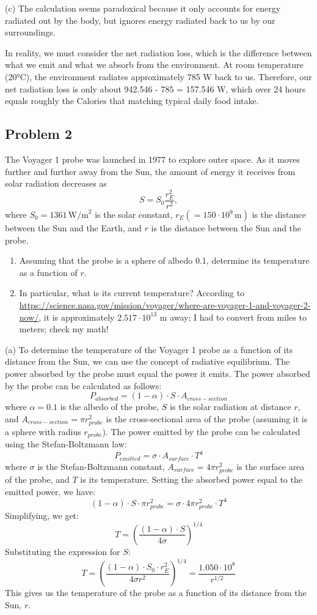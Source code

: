 \documentclass[letterpaper, 11pt]{article}
\newcommand{\1}{\mathds{1}}	%
\theoremstyle{definition}
\begin{document}
(c) The calculation seems paradoxical because it only accounts for energy radiated out by the body, but ignores energy radiated back to us by our surroundings.

In reality, we must consider the net radiation loss, which is the difference between what we emit and what we absorb from the environment. At room temperature (20°C), the environment radiates approximately 785 W back to us. Therefore, our net radiation loss is only about 942.546 - 785 = 157.546 W, which over 24 hours equals roughly the Calories that matching typical daily food intake.
\subsection*{Problem 2}
The Voyager 1 probe was launched in 1977 to explore outer space. As it moves further and further away from the Sun, the amount of energy it receives from solar radiation decreases as
\[
S = S_0 \frac{r_E^2}{r^2},
\]
where $S_0 = 1361\,\text{W/m}^2$ is the solar constant, $r_E (= 150 \cdot 10^9\,\text{m})$ is the distance between the Sun and the Earth, and $r$ is the distance between the Sun and the probe.

\begin{enumerate}
\item[(a)] Assuming that the probe is a sphere of albedo 0.1, determine its temperature as a function of $r$.

\item[(b)] In particular, what is its current temperature? According to \url{https://science.nasa.gov/mission/voyager/where-are-voyager-1-and-voyager-2-now/}, it is approximately $2.517 \cdot 10^{13}$ m away; I had to convert from miles to meters; check my math!
\end{enumerate}

(a) To determine the temperature of the Voyager 1 probe as a function of its distance from the Sun, we can use the concept of radiative equilibrium. The power absorbed by the probe must equal the power it emits.
The power absorbed by the probe can be calculated as follows:
\[P_{absorbed} = (1 - \alpha) \cdot S \cdot A_{cross-section}\]
where $\alpha = 0.1$ is the albedo of the probe, $S$ is the solar radiation at distance $r$, and $A_{cross-section} = \pi r_{probe}^2$ is the cross-sectional area of the probe (assuming it is a sphere with radius $r_{probe}$).
The power emitted by the probe can be calculated using the Stefan-Boltzmann law:
\[
P_{emitted} = \sigma \cdot A_{surface} \cdot T^4
\]
where  $\sigma$ is the Stefan-Boltzmann constant, $A_{surface} = 4 \pi r_{probe}^2$ is the surface area of the probe, and $T$ is its temperature.
Setting the absorbed power equal to the emitted power, we have:
\[(1 - \alpha) \cdot S \cdot \pi r_{probe}^2 = \sigma \cdot 4 \pi r_{probe}^2 \cdot T^4\]
Simplifying, we get:
\[
T = \left( \frac{(1 - \alpha) \cdot S}{4 \sigma} \right)^{1/4}
\]
Substituting the expression for $S$:
\[T = \left( \frac{(1 - \alpha) \cdot S_0 \cdot r_E^2}{4  \sigma r^2} \right)^{1/4}=\frac{1.050 \cdot 10^8}{r^{1/2}}\]
This gives us the temperature of the probe as a function of its distance from the Sun, $r$.
\end{document}
